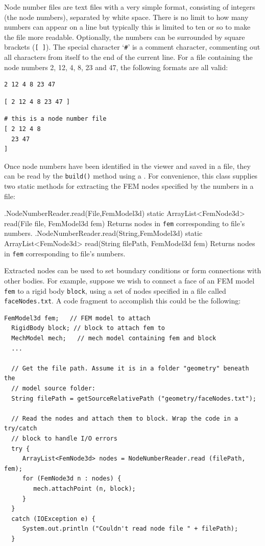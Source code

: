 Node number files are text files with a very simple format, consisting
of integers (the node numbers), separated by white space. There is no
limit to how many numbers can appear on a line but typically this is
limited to ten or so to make the file more readable. Optionally, the
numbers can be surrounded by square brackets ({\tt [ ]}). The special
character `{\tt \#}' is a comment character, commenting out all
characters from itself to the end of the current line. For a file
containing the node numbers 2, 12, 4, 8, 23 and 47, the following
formats are all valid:
%
\begin{lstlisting}[]
2 12 4 8 23 47
\end{lstlisting}
%
\begin{lstlisting}[]
[ 2 12 4 8 23 47 ]
\end{lstlisting}
%
\begin{lstlisting}[]
# this is a node number file
[ 2 12 4 8 
  23 47
]
\end{lstlisting}
%

Once node numbers have been identified in the viewer and saved in a
file, they can be read by the {\tt build()} method using
a .  For
convenience, this class supplies two static methods for extracting the
FEM nodes specified by the numbers in a file:
%
\begin{methodtable}[4pt]{0.45}{0.55}
\midline
%
\methodentry
{\fem.NodeNumberReader.read(File,FemModel3d)}%
{static ArrayList<FemNode3d> read(\brh File file, FemModel3d fem)}%
{Returns nodes in {\tt fem} corresponding to file's numbers.}%
%
\methodentry
{\fem.NodeNumberReader.read(String,FemModel3d)}%
{static ArrayList<FemNode3d> read(\brh String filePath, FemModel3d fem)}%
{Returns nodes in {\tt fem} corresponding to file's numbers.}%
%
\midline
\end{methodtable}
%
Extracted nodes can be used to set boundary conditions or form
connections with other bodies. For example, suppose we wish to connect
a face of an FEM model {\tt fem} to a rigid body {\tt block}, using a
set of nodes specified in a file called {\tt faceNodes.txt}.  A code
fragment to accomplish this could be the following:
%
\begin{lstlisting}[]
  FemModel3d fem;   // FEM model to attach
  RigidBody block; // block to attach fem to
  MechModel mech;   // mech model containing fem and block
  ...

  // Get the file path. Assume it is in a folder "geometry" beneath the
  // model source folder:
  String filePath = getSourceRelativePath ("geometry/faceNodes.txt");

  // Read the nodes and attach them to block. Wrap the code in a try/catch 
  // block to handle I/O errors
  try {
     ArrayList<FemNode3d> nodes = NodeNumberReader.read (filePath, fem);
     for (FemNode3d n : nodes) {
        mech.attachPoint (n, block);
     }
  }
  catch (IOException e) {
     System.out.println ("Couldn't read node file " + filePath);
  }
\end{lstlisting}
%


